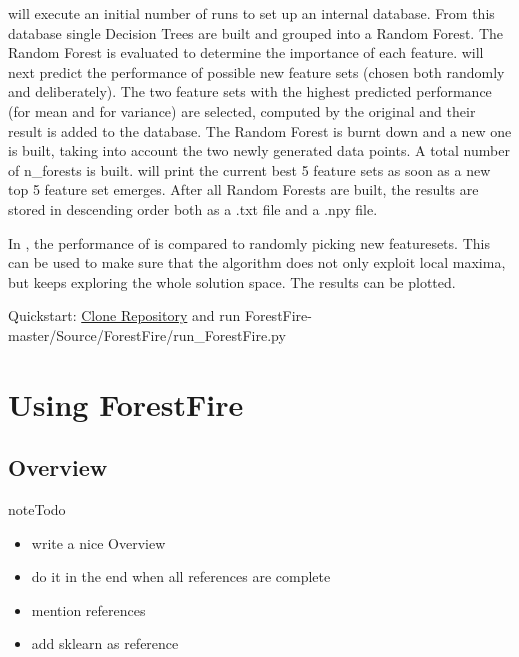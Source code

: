 \documentclass[letterpaper,10pt,english]{sphinxmanual}
\begin{document}
 will execute an initial  number of {\hyperref[\detokenize{Overview:mla}]{}} runs to set up an internal database. 
From this database single Decision Trees are built and grouped into a Random Forest. 
The Random Forest is evaluated to determine the importance of each feature.
 will next predict the performance of possible new feature sets (chosen both randomly and deliberately).
The two feature sets with the highest predicted performance (for mean and for variance) are selected, computed by the
original {\hyperref[\detokenize{Overview:mla}]{}} and their result is added to the database. 
The Random Forest is burnt down and a new one is built, taking into account the two newly generated data points. 
A total number of n\_forests is built.
 will print the current best 5 feature sets as soon as a new top 5 feature set emerges.
After all Random Forests are built, the results are stored in descending order both as a .txt file and a .npy file.

In , the performance of  is compared to randomly picking new featuresets.
This can be used to make sure that the algorithm does not only exploit local maxima, but keeps exploring the 
whole solution space.
The results can be plotted.

Quickstart: \href{https://github.com/weinertmos/ForestFire}{Clone Repository} and run ForestFire-master/Source/ForestFire/run\_ForestFire.py


\chapter{Using ForestFire}
\label{\detokenize{index:get-started}}\label{\detokenize{index:using-forestfire}}

\section{Overview}
\label{\detokenize{Overview:overview}}\label{\detokenize{Overview::doc}}\label{\detokenize{Overview:id1}}
\begin{sphinxadmonition}{note}{Todo}
\begin{itemize}
\item {} 
write a nice Overview

\item {} 
do it in the end when all references are complete

\item {} 
mention references

\item {} 
add sklearn as reference

\end{itemize}
\end{sphinxadmonition}
\end{document}
